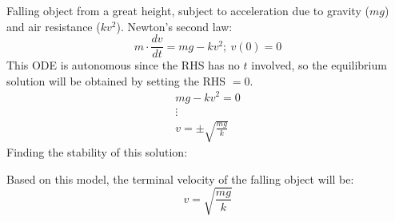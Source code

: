 \documentclass[12pt]{article}
\begin{document}
\begin{example}
  Falling object from a great height, subject to acceleration due to gravity ($mg$) and air resistance ($kv^2$). Newton's second law:
  \begin{equation*}
    m \cdot \frac{dv}{dt} = mg - kv^2;\ v(0) = 0
  \end{equation*}
  This ODE is autonomous since the RHS has no $t$ involved, so the equilibrium solution will be obtained by setting the RHS $= 0$.
  \begin{gather*}
    mg-kv^2 = 0 \\
    \vdots \\
    v = \pm \sqrt{\frac{mg}{k}}
  \end{gather*}
  Finding the stability of this solution: %


  Based on this model, the terminal velocity of the falling object will be:
  \begin{equation*}
    v = \sqrt{\frac{mg}{k}}
  \end{equation*}
\end{example}
\begin{example}
  
\end{example}
\end{document}
